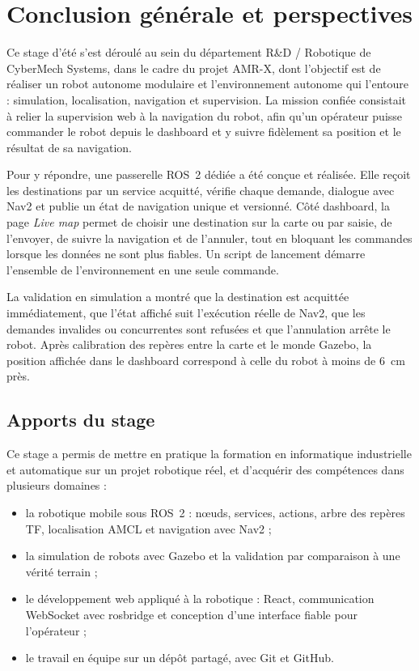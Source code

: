 \chapter*{Conclusion générale et perspectives}

Ce stage d'été s'est déroulé au sein du département R\&D / Robotique de CyberMech Systems,
dans le cadre du projet AMR-X, dont l'objectif est de réaliser un robot autonome modulaire
et l'environnement autonome qui l'entoure : simulation, localisation, navigation et
supervision. La mission confiée consistait à relier la supervision web à la navigation du
robot, afin qu'un opérateur puisse commander le robot depuis le dashboard et y suivre
fidèlement sa position et le résultat de sa navigation.

Pour y répondre, une passerelle ROS~2 dédiée a été conçue et réalisée. Elle reçoit les
destinations par un service acquitté, vérifie chaque demande, dialogue avec Nav2 et publie
un état de navigation unique et versionné. Côté dashboard, la page \emph{Live map} permet
de choisir une destination sur la carte ou par saisie, de l'envoyer, de suivre la
navigation et de l'annuler, tout en bloquant les commandes lorsque les données ne sont plus
fiables. Un script de lancement démarre l'ensemble de l'environnement en une seule
commande.

La validation en simulation a montré que la destination est acquittée immédiatement, que
l'état affiché suit l'exécution réelle de Nav2, que les demandes invalides ou concurrentes
sont refusées et que l'annulation arrête le robot. Après calibration des repères entre la
carte et le monde Gazebo, la position affichée dans le dashboard correspond à celle du
robot à moins de 6~cm près.

\section*{Apports du stage}
Ce stage a permis de mettre en pratique la formation en informatique industrielle et
automatique sur un projet robotique réel, et d'acquérir des compétences dans plusieurs
domaines :
\begin{itemize}
  \item la robotique mobile sous ROS~2 : nœuds, services, actions, arbre des repères TF,
    localisation AMCL et navigation avec Nav2 ;
  \item la simulation de robots avec Gazebo et la validation par comparaison à une vérité
    terrain ;
  \item le développement web appliqué à la robotique : React, communication WebSocket avec
    rosbridge et conception d'une interface fiable pour l'opérateur ;
  \item le travail en équipe sur un dépôt partagé, avec Git et GitHub.
\end{itemize}

